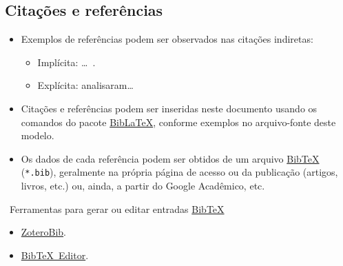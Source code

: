 
\subsection{Citações e referências}

\begin{frame}
	
	\begin{itemize}
		\item Exemplos de referências podem ser observados nas citações indiretas:
		\begin{itemize}
			\item Implícita: \ldots\ \cite{Nriagu1988,Lamport1994,Ekenstein1997}.
			\item Explícita: \textcite{Wizentier1992,Faina2000} analisaram\ldots%
		\end{itemize}
		\item Citações e referências podem ser inseridas neste documento usando os comandos do pacote \href{https://ctan.org/pkg/biblatex/}{Bib\LaTeX\LinkIcon}, conforme exemplos no arquivo-fonte deste modelo.
		\item Os dados de cada referência podem ser obtidos de um arquivo \href{https://www.bibtex.org/}{Bib\TeX\LinkIcon} (\texttt{*.bib}), geralmente na própria página de acesso ou  da publicação (artigos, livros, etc.) ou, ainda, a partir do Google Acadêmico, etc.
	\end{itemize}
	
	\begin{alertblock}{\faInfoCircle\ Ferramentas para gerar ou editar entradas \href{https://www.bibtex.org/}{Bib\TeX\LinkIcon}}
		
		\begin{itemize}
			\item[\tiny\faTools] \href{https://zbib.org/}{ZoteroBib\LinkIcon}.
			\item[\tiny\faTools] \href{https://truben.no/latex/bibtex/}{Bib\TeX\ Editor\LinkIcon}.
		\end{itemize}
		
	\end{alertblock}
	
\end{frame}